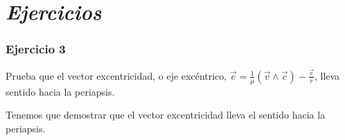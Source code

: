 
\section*{\textit{Ejercicios}}

\begin{Enunciado}
	\subsubsection{Ejercicio 3}
	Prueba que el vector excentricidad, o eje excéntrico, $\vec{e} = \frac{1}{\mu} (\vec{v} \wedge \vec{c}) - \frac{\vec{r}}{r}$, lleva sentido hacia la periapsis.
\end{Enunciado}
	Tenemos que demostrar que el vector excentricidad lleva el sentido hacia la periapsis.


